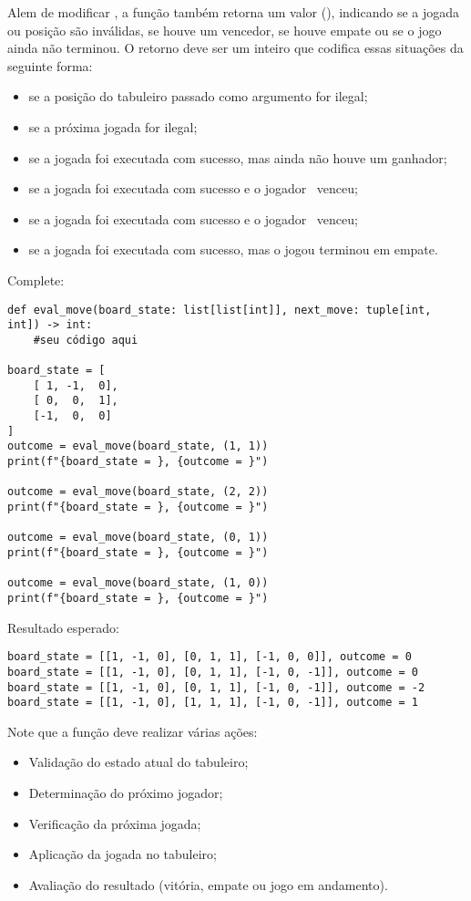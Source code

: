 Alem de modificar , a função também retorna um valor  (), indicando se a
jogada ou posição são inválidas, se houve um vencedor, se houve empate ou se o jogo ainda não terminou.
O retorno  deve ser um inteiro que codifica essas situações da seguinte forma:
\begin{itemize}
\item {} se a posição do tabuleiro passado como argumento for ilegal;
\item {} se a próxima jogada for ilegal;
\item {} se a jogada foi executada com sucesso, mas ainda não houve um ganhador;
\item {} se a jogada foi executada com sucesso e o jogador \px~venceu;
\item {} se a jogada foi executada com sucesso e o jogador \po~venceu;
\item {} se a jogada foi executada com sucesso, mas o jogou terminou em empate.
\end{itemize}

Complete:
\begin{verbatim}
def eval_move(board_state: list[list[int]], next_move: tuple[int, int]) -> int:
    #seu código aqui

board_state = [
    [ 1, -1,  0],
    [ 0,  0,  1],
    [-1,  0,  0]
]
outcome = eval_move(board_state, (1, 1))
print(f"{board_state = }, {outcome = }")

outcome = eval_move(board_state, (2, 2))
print(f"{board_state = }, {outcome = }")

outcome = eval_move(board_state, (0, 1))
print(f"{board_state = }, {outcome = }")

outcome = eval_move(board_state, (1, 0))
print(f"{board_state = }, {outcome = }")
\end{verbatim}

Resultado esperado:
\begin{verbatim}
board_state = [[1, -1, 0], [0, 1, 1], [-1, 0, 0]], outcome = 0
board_state = [[1, -1, 0], [0, 1, 1], [-1, 0, -1]], outcome = 0
board_state = [[1, -1, 0], [0, 1, 1], [-1, 0, -1]], outcome = -2
board_state = [[1, -1, 0], [1, 1, 1], [-1, 0, -1]], outcome = 1
\end{verbatim}

Note que a função deve realizar várias ações:
\begin{itemize}
\item Validação do estado atual do tabuleiro;
\item Determinação do próximo jogador;
\item Verificação da próxima jogada;
\item Aplicação da jogada no tabuleiro;
\item Avaliação do resultado (vitória, empate ou jogo em andamento).
\end{itemize}

